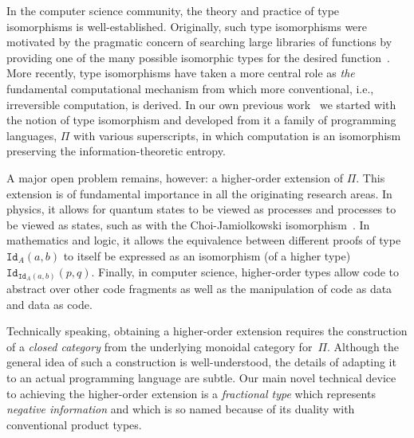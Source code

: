 \documentclass[11pt]{article}
\begin{document}
In the computer science community, the theory and practice of type
isomorphisms is well-established. Originally, such type isomorphisms were
motivated by the pragmatic concern of searching large libraries of functions
by providing one of the many possible isomorphic types for the desired
function~\cite{Rittri:1989:UTS:99370.99384}. More recently, type isomorphisms
have taken a more central role as \emph{the} fundamental computational
mechanism from which more conventional, i.e., irreversible computation, is
derived. In our own previous
work~\cite{James:2012:IE:2103656.2103667,rc2011,rc2012} we started with the
notion of type isomorphism and developed from it a family of programming
languages, $\Pi$ with various superscripts, in which computation is an
isomorphism preserving the information-theoretic entropy.

A major open problem remains, however: a higher-order extension of
$\Pi$. This extension is of fundamental importance in all the originating
research areas. In physics, it allows for quantum states to be viewed as
processes and processes to be viewed as states, such as with the
Choi-Jamiolkowski
isomorphism~\cite{choi1975completely,jamiolkowski1972linear}.  In mathematics
and logic, it allows the equivalence between different proofs of type
$\texttt{Id}_A(a,b)$ to itself be expressed as an isomorphism (of a higher
type) $\texttt{Id}_{\texttt{Id}_A(a,b)}(p,q)$. Finally, in computer science,
higher-order types allow code to abstract over other code fragments as well
as the manipulation of code as data and data as code.

Technically speaking, obtaining a higher-order extension requires the
construction of a \emph{closed category} from the underlying monoidal
category for~$\Pi$. Although the general idea of such a construction is
well-understood, the details of adapting it to an actual programming language
are subtle.  Our main novel technical device to achieving the higher-order
extension is a \emph{fractional type} which represents \emph{negative
information} and which is so named because of its duality with conventional
product types.
\end{document}
